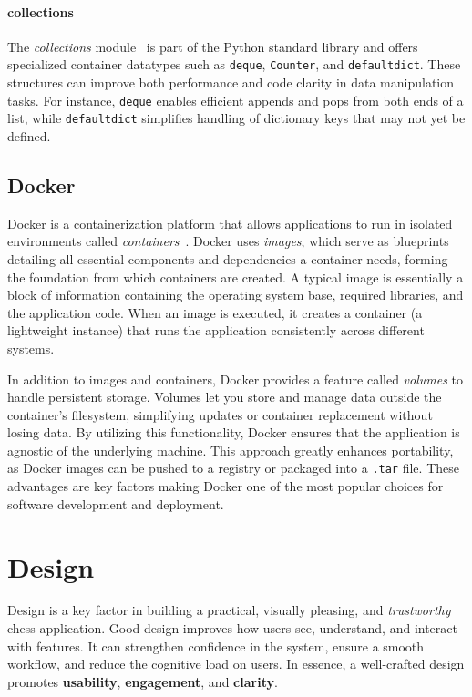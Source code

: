 \documentclass[12pt,a4paper]{article}
\begin{document}
\paragraph{collections}
The \emph{collections} module~\cite{python-collections} is part of the Python standard library and
offers specialized container datatypes such as \texttt{deque}, \texttt{Counter}, and \texttt{defaultdict}. 
These structures can improve both performance and code clarity in data manipulation tasks. 
For instance, \texttt{deque} enables efficient appends and pops from both ends of a list, 
while \texttt{defaultdict} simplifies handling of dictionary keys that may not yet be defined.

\subsection{Docker}
Docker is a containerization platform that allows applications to run in isolated environments
called \emph{containers}~\cite{DockerDocs}. Docker uses \emph{images}, which serve as blueprints
detailing all essential components and dependencies a container needs, forming the foundation from
which containers are created. A typical image is essentially a block of information containing the
operating system base, required libraries, and the application code. When an image is executed, it
creates a container (a lightweight instance) that runs the application consistently across different
systems.

In addition to images and containers, Docker provides a feature called \emph{volumes} to handle
persistent storage. Volumes let you store and manage data outside the container's filesystem,
simplifying updates or container replacement without losing data. By utilizing this functionality,
Docker ensures that the application is agnostic of the underlying machine. This approach greatly
enhances portability, as Docker images can be pushed to a registry or packaged into a \texttt{.tar}
file. These advantages are key factors making Docker one of the most popular choices for software
development and deployment.



\section{Design}
\label{sec:design}

Design is a key factor in building a practical, visually pleasing, 
and \emph{trustworthy} chess application. Good design improves how 
users see, understand, and interact with features. It can strengthen 
confidence in the system, ensure a smooth workflow, and reduce 
the cognitive load on users. In essence, a well-crafted design 
promotes \textbf{usability}, \textbf{engagement}, and \textbf{clarity}.
\end{document}
